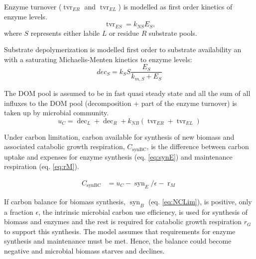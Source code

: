 Enzyme turnover ($\operatorname{tvr}_{ER}$ and $\operatorname{tvr}_{EL}$) is
modelled as first order kinetics of enzyme levels.
\begin{equation}
\label{eq:tvrE}
\operatorname{tvr}_{ES} = k_{NS} E_S \text{,}
\end{equation}
where $S$ represents either labile $L$ or residue $R$ substrate pools.  

% 
Substrate depolymerization is modelled first order to substrate
availability an with a saturating Michaelis-Menten kinetics to enzyme levels:
\begin{equation}
\label{eq:dec}
dec_S = k_S S \frac{E_S}{k_{m,S} + E_S} 
\end{equation}
 
The DOM pool is assumed to be in fast quasi steady state and all the sum of all
influxes to the DOM pool (decomposition + part of the enzyme turnover) is taken
up by microbial community.
\begin{equation}
\label{eq:uC}
u_C = \operatorname{dec}_L + \operatorname{dec}_R +  k_{NB}
(\operatorname{tvr}_{ER} + \operatorname{tvr}_{EL})
\end{equation}

Under carbon limitation, carbon available for synthesis of new biomass and
associated catabolic growth respiration, $C_{\operatorname{synBC}}$, is the
difference between carbon uptake and expenses for enzyme synthesis (eq.
\ref{eq:synE}) and maintenance respiration (eq.
\ref{eq:rM}).

\begin{subequations}
\label{eq:synB}
\begin{align}
\label{eq:synBC} C_{\operatorname{synBC}} &= u_C -
\operatorname{syn}_E/\epsilon - \operatorname{r}_{M} 
\end{align}
\end{subequations}

If carbon balance for biomass synthesis, $\operatorname{syn}_B$ (eq.
\ref{eq:NCLim}), is positive, only a fraction $\epsilon$, the intrinsic
microbial carbon use efficiency, is used for synthesis of biomass and enzymes
and the rest is required for catabolic growth respiration $r_G$ to support this
synthesis.
The model assumes that requirements for enzyme synthesis and maintenance must be
met. Hence, the balance could become negative and microbial biomass starves and
declines.

